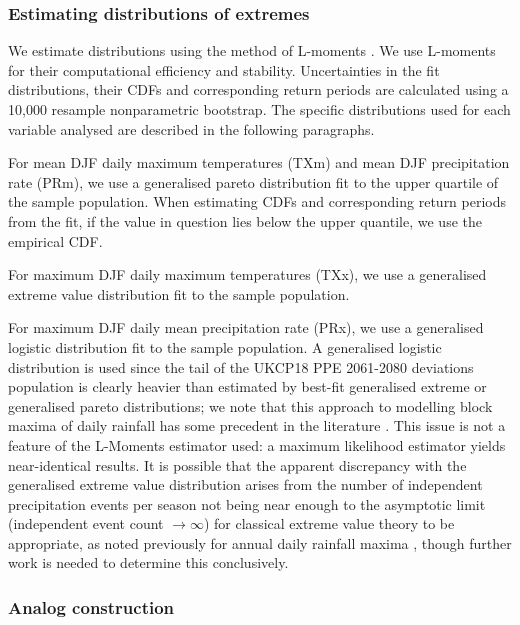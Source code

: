    \subsubsection{Estimating distributions of extremes}

      We estimate distributions using the method of L-moments \citep{hosking_estimation_1985,hosking_l-moments_1990,hosking_regional_1997}. We use L-moments for their computational efficiency and stability. Uncertainties in the fit distributions, their CDFs and corresponding return periods are calculated using a 10,000 resample nonparametric bootstrap. The specific distributions used for each variable analysed are described in the following paragraphs.
      
      For mean DJF daily maximum temperatures (TXm) and mean DJF precipitation rate (PRm), we use a generalised pareto distribution \citep{coles_introduction_2001,hosking_parameter_1987} fit to the upper quartile of the sample population. When estimating CDFs and corresponding return periods from the fit, if the value in question lies below the upper quantile, we use the empirical CDF.

      For maximum DJF daily maximum temperatures (TXx), we use a generalised extreme value distribution fit to the sample population.

      For maximum DJF daily mean precipitation rate (PRx), we use a generalised logistic distribution \citep{hosking_l-moments_1990} fit to the sample population. A generalised logistic distribution is used since the tail of the UKCP18 PPE 2061-2080 deviations population is clearly heavier than estimated by best-fit generalised extreme or generalised pareto distributions; we note that this approach to modelling block maxima of daily rainfall has some precedent in the literature \citep{kysely_probability_2007,wan_zin_best_2009}. This issue is not a feature of the L-Moments estimator used: a maximum likelihood estimator yields near-identical results. It is possible that the apparent discrepancy with the generalised extreme value distribution arises from the number of independent precipitation events per season not being near enough to the asymptotic limit (independent event count $\rightarrow \infty$) for classical extreme value theory to be appropriate, as noted previously for annual daily rainfall maxima \citep{marani_metastatistical_2015}, though further work is needed to determine this conclusively.

    \subsubsection{Analog construction}

